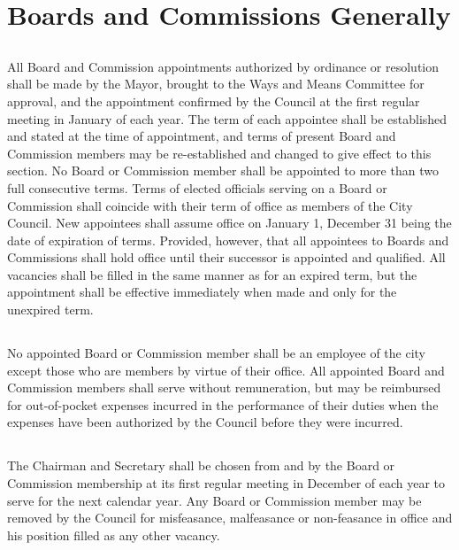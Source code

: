 \section{Boards and Commissions Generally}
\subsection{}
All Board and Commission appointments authorized by ordinance or resolution shall be made by the Mayor, brought to the Ways and Means Committee for approval, and the appointment confirmed by the Council at the first regular meeting in January of each year.  The term of each appointee shall be established and stated at the time of appointment, and terms of present Board and Commission members may be re-established and changed to give effect to this section. No Board or Commission member shall be appointed to more than two full consecutive terms. Terms of elected officials serving on a Board or Commission shall coincide with their term of office as members of the City Council. New appointees shall assume office on January 1, December 31 being the date of expiration of terms. Provided, however, that all appointees to Boards and Commissions shall hold office until their successor is appointed and qualified. All vacancies shall be filled in the same manner as for an expired term, but the appointment shall be effective immediately when made and only for the unexpired term.
\subsection{}
No appointed Board or Commission member shall be an employee of the city except those who are members by virtue of their office. All appointed Board and Commission members shall serve without remuneration, but may be reimbursed for out-of-pocket expenses incurred in the performance of their duties when the expenses have been authorized by the Council before they were incurred.
\subsection{}
The Chairman and Secretary shall be chosen from and by the Board or Commission membership at its first regular meeting in December of each year to serve for the next calendar year. Any Board or Commission member may be removed by the Council for misfeasance, malfeasance or non-feasance in office and his position filled as any other vacancy.
